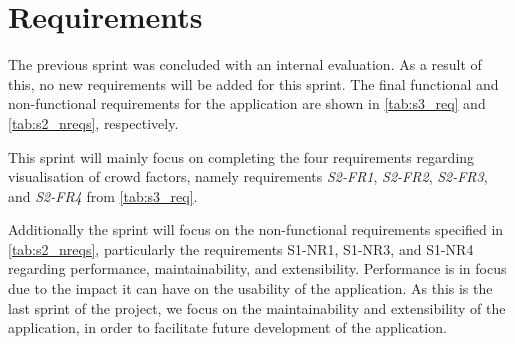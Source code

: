 \section{Requirements} \label{sec:s4_reqs}
The previous sprint was concluded with an internal evaluation. As a result of this, no new requirements will be added for this sprint. The final functional and non-functional requirements for the application are shown in \cref{tab:s3_req} and \cref{tab:s2_nreqs}, respectively.

This sprint will mainly focus on completing the four requirements regarding visualisation of crowd factors, namely requirements \emph{S2-FR1}, \emph{S2-FR2}, \emph{S2-FR3}, and \emph{S2-FR4} from \cref{tab:s3_req}.

Additionally the sprint will focus on the non-functional requirements specified in \cref{tab:s2_nreqs}, particularly the requirements S1-NR1, S1-NR3, and S1-NR4 regarding performance, maintainability, and extensibility. Performance is in focus due to the impact it can have on the usability of the application. As this is the last sprint of the project, we focus on the maintainability and extensibility of the application, in order to facilitate future development of the application.